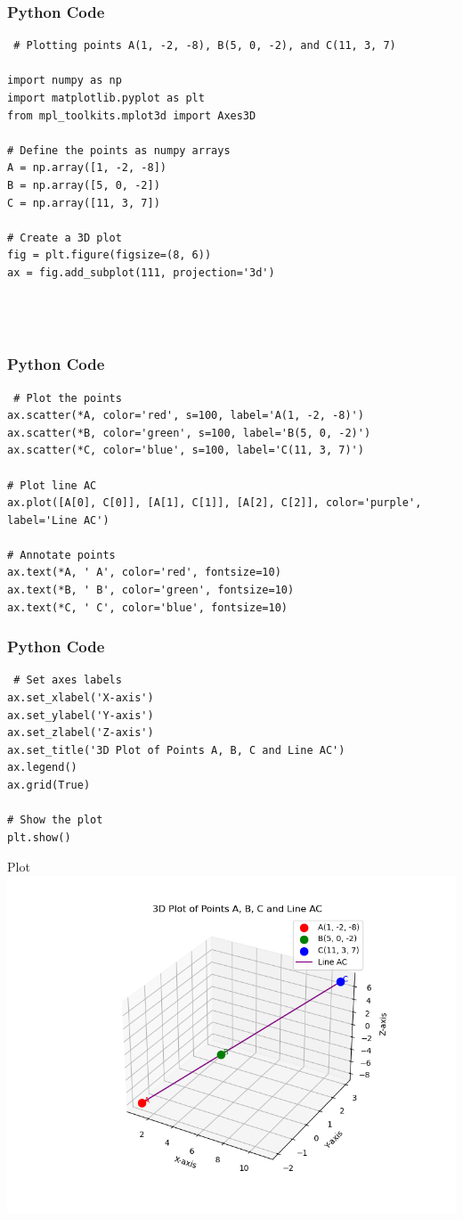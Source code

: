 \documentclass{beamer}
\begin{document}
\begin{frame}[fragile]
    \frametitle{Python Code}
    \begin{lstlisting}
 # Plotting points A(1, -2, -8), B(5, 0, -2), and C(11, 3, 7)
 
import numpy as np
import matplotlib.pyplot as plt
from mpl_toolkits.mplot3d import Axes3D

# Define the points as numpy arrays
A = np.array([1, -2, -8])
B = np.array([5, 0, -2])
C = np.array([11, 3, 7])

# Create a 3D plot
fig = plt.figure(figsize=(8, 6))
ax = fig.add_subplot(111, projection='3d')




    \end{lstlisting}
\end{frame}

\begin{frame}[fragile]
    \frametitle{Python Code}
    \begin{lstlisting}
 # Plot the points
ax.scatter(*A, color='red', s=100, label='A(1, -2, -8)')
ax.scatter(*B, color='green', s=100, label='B(5, 0, -2)')
ax.scatter(*C, color='blue', s=100, label='C(11, 3, 7)')

# Plot line AC
ax.plot([A[0], C[0]], [A[1], C[1]], [A[2], C[2]], color='purple', label='Line AC')

# Annotate points
ax.text(*A, ' A', color='red', fontsize=10)
ax.text(*B, ' B', color='green', fontsize=10)
ax.text(*C, ' C', color='blue', fontsize=10)

    \end{lstlisting}
\end{frame}

\begin{frame}[fragile]
    \frametitle{Python Code}
    \begin{lstlisting}
 # Set axes labels
ax.set_xlabel('X-axis')
ax.set_ylabel('Y-axis')
ax.set_zlabel('Z-axis')
ax.set_title('3D Plot of Points A, B, C and Line AC')
ax.legend()
ax.grid(True)

# Show the plot
plt.show()

    \end{lstlisting}
\end{frame}

 
 
\begin{frame}{Plot}
    \centering
    \includegraphics[width=\columnwidth, height=0.8\textheight, keepaspectratio]{figs/Fig.png}     
\end{frame}
\end{document}
